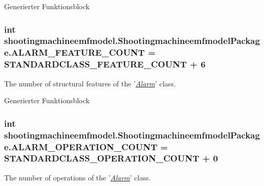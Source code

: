 Generierter Funktionsblock  \hypertarget{interfaceshootingmachineemfmodel_1_1_shootingmachineemfmodel_package_a4236d01c86578b67309fd2839b61148c}{
\subsubsection[{A\-L\-A\-R\-M\-\_\-\-F\-E\-A\-T\-U\-R\-E\-\_\-\-C\-O\-U\-N\-T}]{\setlength{\rightskip}{0pt plus 5cm}int shootingmachineemfmodel.\-Shootingmachineemfmodel\-Package.\-A\-L\-A\-R\-M\-\_\-\-F\-E\-A\-T\-U\-R\-E\-\_\-\-C\-O\-U\-N\-T = {\bf S\-T\-A\-N\-D\-A\-R\-D\-C\-L\-A\-S\-S\-\_\-\-F\-E\-A\-T\-U\-R\-E\-\_\-\-C\-O\-U\-N\-T} + 6}}\label{interfaceshootingmachineemfmodel_1_1_shootingmachineemfmodel_package_a4236d01c86578b67309fd2839b61148c}
The number of structural features of the '{\itshape \hyperlink{interfaceshootingmachineemfmodel_1_1_alarm}{Alarm}}' class.

Generierter Funktionsblock  \hypertarget{interfaceshootingmachineemfmodel_1_1_shootingmachineemfmodel_package_a4abb13fde140669afe6ee64c769d6431}{
\subsubsection[{A\-L\-A\-R\-M\-\_\-\-O\-P\-E\-R\-A\-T\-I\-O\-N\-\_\-\-C\-O\-U\-N\-T}]{\setlength{\rightskip}{0pt plus 5cm}int shootingmachineemfmodel.\-Shootingmachineemfmodel\-Package.\-A\-L\-A\-R\-M\-\_\-\-O\-P\-E\-R\-A\-T\-I\-O\-N\-\_\-\-C\-O\-U\-N\-T = {\bf S\-T\-A\-N\-D\-A\-R\-D\-C\-L\-A\-S\-S\-\_\-\-O\-P\-E\-R\-A\-T\-I\-O\-N\-\_\-\-C\-O\-U\-N\-T} + 0}}\label{interfaceshootingmachineemfmodel_1_1_shootingmachineemfmodel_package_a4abb13fde140669afe6ee64c769d6431}
The number of operations of the '{\itshape \hyperlink{interfaceshootingmachineemfmodel_1_1_alarm}{Alarm}}' class.

